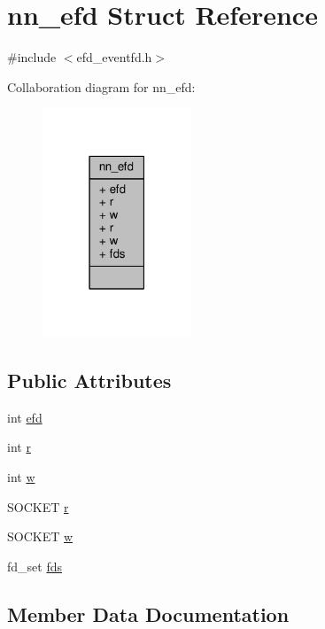 \hypertarget{structnn__efd}{}\section{nn\+\_\+efd Struct Reference}
\label{structnn__efd}


{\ttfamily \#include $<$efd\+\_\+eventfd.\+h$>$}



Collaboration diagram for nn\+\_\+efd\+:\nopagebreak
\begin{figure}[H]
\begin{center}
\leavevmode
\includegraphics[width=126pt]{structnn__efd__coll__graph}
\end{center}
\end{figure}
\subsection*{Public Attributes}
\begin{DoxyCompactItemize}
\item 
int \hyperlink{structnn__efd_a754cb58e2b0a2efed6e5aa81a98275e0}{efd}
\item 
int \hyperlink{structnn__efd_a83da20c603791c11e137bf0411c33edd}{r}
\item 
int \hyperlink{structnn__efd_a871578e6e6cbf91469323f57655bb9db}{w}
\item 
S\+O\+C\+K\+ET \hyperlink{structnn__efd_ab5890557c42eae3e980c7c7b35e13ca6}{r}
\item 
S\+O\+C\+K\+ET \hyperlink{structnn__efd_a23bfc263f640b579e1a7846c7f3b81a0}{w}
\item 
fd\+\_\+set \hyperlink{structnn__efd_a97f26e7918650b84462a101e2dd40d49}{fds}
\end{DoxyCompactItemize}


\subsection{Member Data Documentation}
